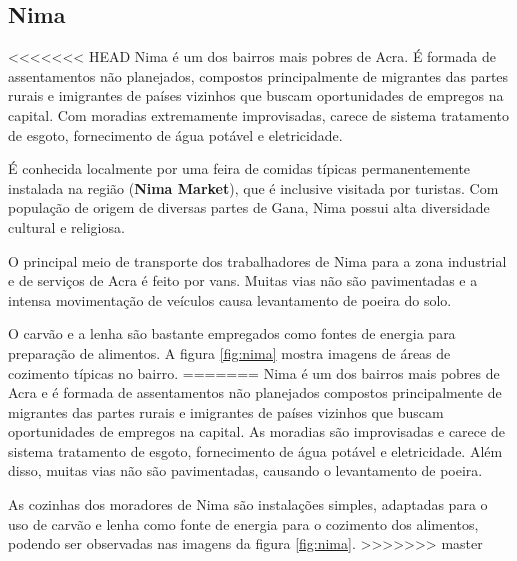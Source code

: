 \subsection{Nima}

<<<<<<< HEAD
Nima é um dos bairros mais pobres de Acra. É formada de assentamentos não 
planejados, compostos principalmente de migrantes das partes rurais e 
imigrantes de países vizinhos que buscam oportunidades de empregos na capital. 
Com moradias extremamente improvisadas, carece de sistema tratamento de esgoto, 
fornecimento de água potável e eletricidade. 

É conhecida localmente por uma feira de comidas típicas permanentemente 
instalada na região (\textbf{Nima Market}), que é inclusive visitada por turistas.
Com população de origem de diversas partes de Gana, Nima possui 
alta diversidade cultural e religiosa.

O principal meio de transporte dos trabalhadores de Nima para a zona industrial
e de serviços de Acra é feito por vans. 
Muitas vias não são pavimentadas e a intensa movimentação de veículos causa 
levantamento de poeira do solo.

O carvão e a lenha são bastante empregados como fontes de energia para preparação de 
alimentos. A figura \ref{fig:nima} mostra imagens de áreas de cozimento típicas no bairro.
=======
Nima é um dos bairros mais pobres de Acra e é formada de assentamentos não 
planejados compostos principalmente de migrantes das partes rurais e 
imigrantes de países vizinhos que buscam oportunidades de empregos na capital. 
As moradias são improvisadas e carece de sistema tratamento de esgoto, 
fornecimento de água potável e eletricidade. Além disso, muitas vias não são 
pavimentadas, causando o levantamento de poeira. 



As cozinhas dos moradores de Nima são instalações simples, adaptadas para o uso
de carvão e lenha como fonte de energia para o cozimento dos alimentos, 
podendo ser observadas nas imagens da figura \ref{fig:nima}.
>>>>>>> master

